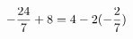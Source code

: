 \documentclass[preview]{standalone}
\begin{document}
\begin{align*}
\special{dvisvgm:raw <g id='unique000'>}- \frac{24}{7} + 8 = 4 - 2 (- \frac{2}{7})\special{dvisvgm:raw </g>}
\end{align*}
\end{document}

